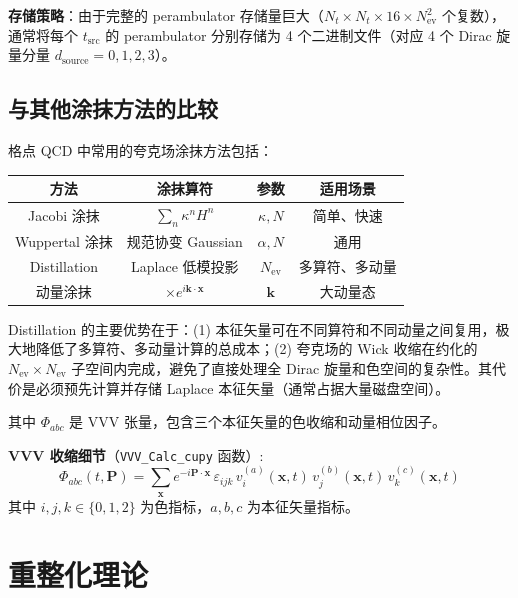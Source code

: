 \documentclass[11pt,a4paper]{ctexart}
\begin{document}
\textbf{存储策略}：由于完整的 perambulator 存储量巨大（$N_t \times N_t \times 16 \times N_{\text{ev}}^2$ 个复数），通常将每个 $t_{\text{src}}$ 的 perambulator 分别存储为 4 个二进制文件（对应 4 个 Dirac 旋量分量 $d_{\text{source}} = 0,1,2,3$）。

\subsection{与其他涂抹方法的比较}

格点 QCD 中常用的夸克场涂抹方法包括：
\begin{center}
\begin{tabular}{c c c c}
\toprule
\textbf{方法} & \textbf{涂抹算符} & \textbf{参数} & \textbf{适用场景} \\
\midrule
Jacobi 涂抹 & $\sum_n \kappa^n H^n$ & $\kappa, N$ & 简单、快速 \\
Wuppertal 涂抹 & 规范协变 Gaussian & $\alpha, N$ & 通用 \\
Distillation & Laplace 低模投影 & $N_{\text{ev}}$ & 多算符、多动量 \\
动量涂抹 & $\times e^{i\mathbf{k}\cdot\mathbf{x}}$ & $\mathbf{k}$ & 大动量态 \\
\bottomrule
\end{tabular}
\end{center}

Distillation 的主要优势在于：(1) 本征矢量可在不同算符和不同动量之间复用，极大地降低了多算符、多动量计算的总成本；(2) 夸克场的 Wick 收缩在约化的 $N_{\text{ev}} \times N_{\text{ev}}$ 子空间内完成，避免了直接处理全 Dirac 旋量和色空间的复杂性。其代价是必须预先计算并存储 Laplace 本征矢量（通常占据大量磁盘空间）。

其中 $\Phi_{abc}$ 是 VVV 张量，包含三个本征矢量的色收缩和动量相位因子。

\textbf{VVV 收缩细节}（\texttt{VVV\_Calc\_cupy} 函数）:
\begin{equation}\label{eq:vvv}
\Phi_{abc}(t, \mathbf{P}) = \sum_{\mathbf{x}} e^{-i\mathbf{P}\cdot\mathbf{x}} \,
\varepsilon_{ijk} \, v^{(a)}_i(\mathbf{x}, t) \,
v^{(b)}_j(\mathbf{x}, t) \, v^{(c)}_k(\mathbf{x}, t)
\end{equation}
其中 $i,j,k \in \{0,1,2\}$ 为色指标，$a,b,c$ 为本征矢量指标。

\section{重整化理论}
\end{document}
